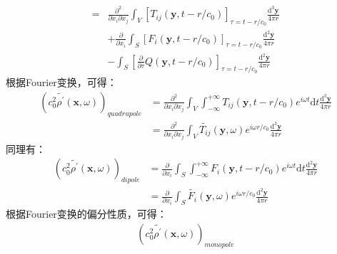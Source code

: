 \begin{enumerate}
\begin{equation}
\begin{aligned}
                =&\frac{\partial^{2}}{\partial x_{i} \partial x_{j}} \int_{V}\left[T_{i j}\left(\mathbf{y}, t-r / c_{0}\right)\right]_{\tau=t-r / c_{0}} \frac{\mathrm{d}^{3} \mathbf{y}}{4 \pi r} \\
                &+\frac{\partial}{\partial x_{i}} \int_{S}\left[F_{i}\left(\mathbf{y}, t-r / c_{0}\right)\right]_{\tau=t-r / c_{0}} \frac{\mathrm{d}^{2} \mathbf{y}}{4 \pi r} \\
                &-\int_{S}\left[\frac{\partial}{\partial \tau} Q\left(\mathbf{y}, t-r / c_{0}\right)\right]_{\tau=t-r / c_{0}} \frac{\mathrm{d}^{2} \mathbf{y}}{4 \pi r}
            \end{aligned}
        \end{equation}
        根据Fourier变换，可得：
        \begin{equation}
            \begin{aligned}
                \left( c_{0}^{2} \tilde{\rho^{\prime}}(\mathbf{x}, \omega) \right)_{quadrupole}
                &= \frac{\partial^{2}}{\partial x_{i} \partial x_{j}} \int_{V} \int_{-\infty}^{+\infty} T_{i j}(\mathbf{y}, t-r / c_{0}) e^{i \omega t}\mathrm{d} t \frac{\mathrm{d}^{3} \mathbf{y}}{4 \pi r} \\
                &= \frac{\partial^{2}}{\partial x_{i} \partial x_{j}} \int_{V} \widetilde{T_{i j}}(\mathbf{y}, \omega) e^{i \omega r / c_{0}} \frac{\mathrm{d}^{3} \mathbf{y}}{4 \pi r}
            \end{aligned}
        \end{equation}
        同理有：
        \begin{equation}
            \begin{aligned}
                \left( c_{0}^{2} \tilde{\rho^{\prime}}(\mathbf{x}, \omega) \right)_{dipole}
                &= \frac{\partial}{\partial x_{i}} \int_{S} \int_{-\infty}^{+\infty} F_{i}(\mathbf{y}, t-r / c_{0}) e^{i \omega t}\mathrm{d} t \frac{\mathrm{d}^{2} \mathbf{y}}{4 \pi r} \\
                &= \frac{\partial}{\partial x_{i}} \int_{S} \widetilde{F_{i}}(\mathbf{y}, \omega) e^{i \omega r / c_{0}} \frac{\mathrm{d}^{2} \mathbf{y}}{4 \pi r}
            \end{aligned}
        \end{equation}
        根据Fourier变换的偏分性质，可得：
        \begin{equation}
            \begin{aligned}
                \left( c_{0}^{2} \tilde{\rho^{\prime}}(\mathbf{x}, \omega) \right)_{monopole}

\end{aligned}
\end{equation}
\end{enumerate}
